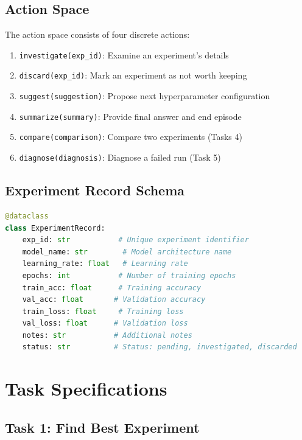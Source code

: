 \documentclass[12pt,a4paper]{article}
\begin{document}
\subsection{Action Space}

The action space consists of four discrete actions:

\begin{enumerate}
	\item \texttt{investigate(exp\_id)}: Examine an experiment's details
	\item \texttt{discard(exp\_id)}: Mark an experiment as not worth keeping
	\item \texttt{suggest(suggestion)}: Propose next hyperparameter configuration
	\item \texttt{summarize(summary)}: Provide final answer and end episode
	\item \texttt{compare(comparison)}: Compare two experiments (Tasks 4)
	\item \texttt{diagnose(diagnosis)}: Diagnose a failed run (Task 5)
\end{enumerate}

\subsection{Experiment Record Schema}

\begin{lstlisting}[language=Python, caption={ExperimentRecord Model}]
@dataclass
class ExperimentRecord:
    exp_id: str           # Unique experiment identifier
    model_name: str        # Model architecture name
    learning_rate: float   # Learning rate
    epochs: int           # Number of training epochs
    train_acc: float      # Training accuracy
    val_acc: float       # Validation accuracy
    train_loss: float     # Training loss
    val_loss: float      # Validation loss
    notes: str           # Additional notes
    status: str          # Status: pending, investigated, discarded
\end{lstlisting}

\section{Task Specifications}

\subsection{Task 1: Find Best Experiment}
\end{document}
